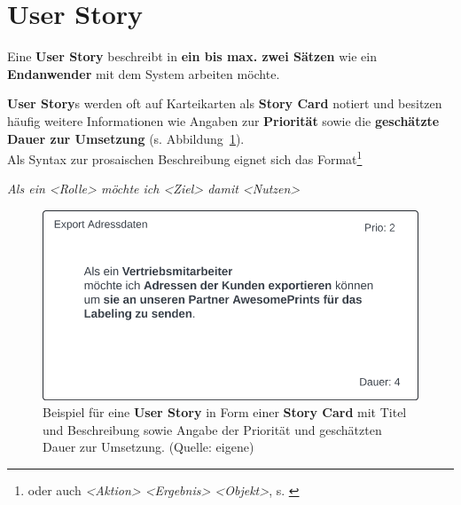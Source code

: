 \section{User Story}

\begin{tcolorbox}[title=User Story]
Eine \textbf{User Story} beschreibt in \textbf{ein bis max. zwei Sätzen} wie ein \textbf{Endanwender} mit dem System arbeiten möchte.

\noindent
\textbf{User Story}s werden oft auf Karteikarten als \textbf{Story Card} notiert und besitzen häufig weitere Informationen wie Angaben zur \textbf{Priorität} sowie die \textbf{geschätzte Dauer zur Umsetzung} (s. Abbildung~\ref{fig:storycard}).\\

\noindent
Als Syntax zur prosaischen Beschreibung eignet sich das Format\footnote{oder auch  \textit{<Aktion> <Ergebnis> <Objekt>}, s. \cite[241]{Coh09}}

\begin{center}
    \textit{Als ein <Rolle> möchte ich <Ziel> damit <Nutzen>}
\end{center}
\end{tcolorbox}

\begin{figure}
    \centering
    \includegraphics[scale=0.4]{chapters/Anhang/CheatSheets/img/StoryCard}
    \caption{Beispiel für eine \textbf{User Story} in Form einer \textbf{Story Card} mit Titel und Beschreibung sowie Angabe der Priorität und geschätzten Dauer zur Umsetzung. (Quelle: eigene)}
    \label{fig:storycard}
\end{figure}